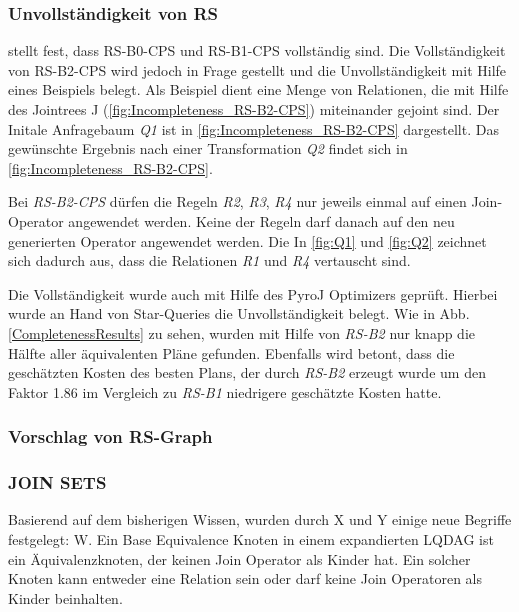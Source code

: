 \subsubsection{Unvollständigkeit von RS}




\cite{shanbhag2014optimizing} stellt fest, dass RS-B0-CPS und RS-B1-CPS vollständig sind. Die Vollständigkeit von RS-B2-CPS wird jedoch in Frage gestellt und die Unvollständigkeit mit Hilfe eines Beispiels belegt. Als Beispiel dient eine Menge von Relationen, die mit Hilfe des Jointrees J (\ref{fig:Incompleteness_RS-B2-CPS}) miteinander gejoint sind. Der Initale Anfragebaum \textit{Q1} ist in \ref{fig:Incompleteness_RS-B2-CPS} dargestellt. Das gewünschte Ergebnis nach einer Transformation \textit{Q2}  findet sich in \ref{fig:Incompleteness_RS-B2-CPS}. 

Bei \textit{RS-B2-CPS} dürfen die Regeln \textit{R2}, \textit{R3}, \textit{R4} nur jeweils einmal auf einen Join-Operator angewendet werden. Keine der Regeln darf danach auf den neu generierten Operator angewendet werden. Die In \ref{fig:Q1} und \ref{fig:Q2} zeichnet sich dadurch aus, dass die Relationen \textit{R1} und \textit{R4} vertauscht sind.


Die Vollständigkeit wurde auch mit Hilfe des PyroJ Optimizers geprüft. Hierbei wurde an Hand von Star-Queries  die Unvollständigkeit belegt. Wie in Abb. \ref{CompletenessResults} zu sehen, wurden mit Hilfe von \textit{RS-B2} nur knapp die Hälfte aller äquivalenten Pläne gefunden. Ebenfalls wird betont, dass die geschätzten Kosten des besten Plans, der durch \textit{RS-B2} erzeugt wurde um den Faktor 1.86 im Vergleich zu \textit{RS-B1} niedrigere geschätzte Kosten hatte.







\subsubsection{Vorschlag von RS-Graph}

\subsubsection{JOIN SETS}

Basierend auf dem bisherigen Wissen, wurden durch X und Y einige neue Begriffe festgelegt: W.
Ein Base Equivalence Knoten in einem expandierten LQDAG ist ein Äquivalenzknoten, der keinen Join Operator als Kinder hat. Ein solcher Knoten kann entweder eine Relation sein oder darf keine Join Operatoren als Kinder beinhalten.

